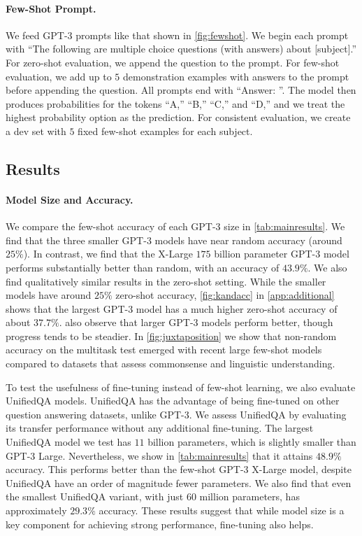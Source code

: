 \paragraph{Few-Shot Prompt.} We feed GPT-3 prompts like that shown in \ref{fig:fewshot}. We begin each prompt with ``The following are multiple choice questions (with answers) about [subject].'' For zero-shot evaluation, we append the question to the prompt. For few-shot evaluation, we add up to $5$ demonstration examples with answers to the prompt before appending the question. All prompts end with ``Answer: ''. The model then produces probabilities for the tokens ``A,'' ``B,'' ``C,'' and ``D,'' and we treat the highest probability option as the prediction. For consistent evaluation, we create a dev set with $5$ fixed few-shot examples for each subject.

\subsection{Results}

\paragraph{Model Size and Accuracy.}

We compare the few-shot accuracy of each GPT-3 size in \ref{tab:mainresults}. We find that the three smaller GPT-3 models have near random accuracy (around $25\%$). 
In contrast, we find that the X-Large $175$ billion parameter GPT-3 model performs substantially better than random, with an accuracy of $43.9\%$. We also find qualitatively similar results in the zero-shot setting. While the smaller models have around $25\%$ zero-shot accuracy, \ref{fig:kandacc} in \ref{app:additional} shows that the largest GPT-3 model has a much higher zero-shot accuracy of about $37.7\%$. \citet{brown2020gpt3} also observe that larger GPT-3 models perform better, though progress tends to be steadier. In \ref{fig:juxtaposition} we show that non-random accuracy on the multitask test emerged with recent large few-shot models compared to datasets that assess commonsense and linguistic understanding.

To test the usefulness of fine-tuning instead of few-shot learning, we also evaluate UnifiedQA models. UnifiedQA has the advantage of being fine-tuned on other question answering datasets, unlike GPT-3. We assess UnifiedQA by evaluating its transfer performance without any additional fine-tuning. The largest UnifiedQA model we test has $11$ billion parameters, which is slightly smaller than GPT-3 Large. Nevertheless, we show in \ref{tab:mainresults} that it attains $48.9\%$ accuracy. This performs better than the few-shot GPT-3 X-Large model, despite UnifiedQA have an order of magnitude fewer parameters. We also find that even the smallest UnifiedQA variant, with just $60$ million parameters, has approximately $29.3\%$ accuracy. These results suggest that while model size is a key component for achieving strong performance, fine-tuning also helps.


